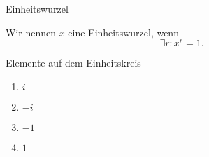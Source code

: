 \documentclass[class=article, crop=false]{standalone}
\begin{document}
\begin{zettel}{Einheitswurzel}
\begin{flashcard}
    \begin{definition}[Einheitswurzel]
        Wir nennen $x$ eine Einheitswurzel, wenn
        \[
            \exists r : x^r = 1
        .\]
    \end{definition}
    \begin{example}[Einheitswurzeln]
        Elemente auf dem Einheitskreis
        \begin{enumerate}
            \item $i$ 
            \item $-i$ 
            \item $-1$ 
            \item $1$ 
        \end{enumerate}
    \end{example}

\end{flashcard}
\end{zettel}
\end{document}
